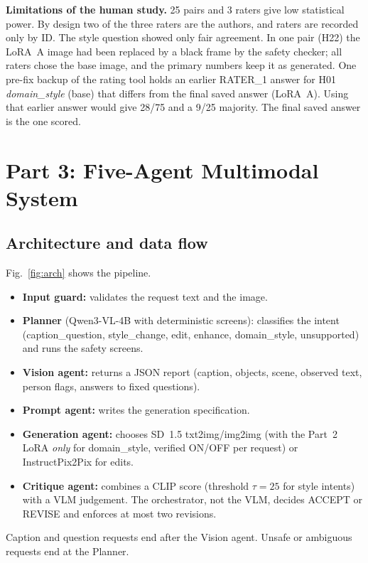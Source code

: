 \documentclass[conference]{IEEEtran}
\begin{document}
\textbf{Limitations of the human study.} 25 pairs and 3 raters give low statistical power. By design two of the three raters are the authors, and raters are recorded only by ID. The style question showed only fair agreement. In one pair (H22) the LoRA~A image had been replaced by a black frame by the safety checker; all raters chose the base image, and the primary numbers keep it as generated. One pre-fix backup of the rating tool holds an earlier RATER\_1 answer for H01 \emph{domain\_style} (base) that differs from the final saved answer (LoRA~A). Using that earlier answer would give 28/75 and a 9/25 majority. The final saved answer is the one scored.

\section{Part 3: Five-Agent Multimodal System}
\subsection{Architecture and data flow}
Fig.~\ref{fig:arch} shows the pipeline.
\begin{itemize}
\item \textbf{Input guard:} validates the request text and the image.
\item \textbf{Planner} (Qwen3-VL-4B with deterministic screens): classifies the intent (caption\_question, style\_change, edit, enhance, domain\_style, unsupported) and runs the safety screens.
\item \textbf{Vision agent:} returns a JSON report (caption, objects, scene, observed text, person flags, answers to fixed questions).
\item \textbf{Prompt agent:} writes the generation specification.
\item \textbf{Generation agent:} chooses SD~1.5 txt2img/img2img (with the Part~2 LoRA \emph{only} for domain\_style, verified ON/OFF per request) or InstructPix2Pix for edits.
\item \textbf{Critique agent:} combines a CLIP score (threshold $\tau{=}25$ for style intents) with a VLM judgement. The orchestrator, not the VLM, decides ACCEPT or REVISE and enforces at most two revisions.
\end{itemize}
Caption and question requests end after the Vision agent. Unsafe or ambiguous requests end at the Planner.
\end{document}
